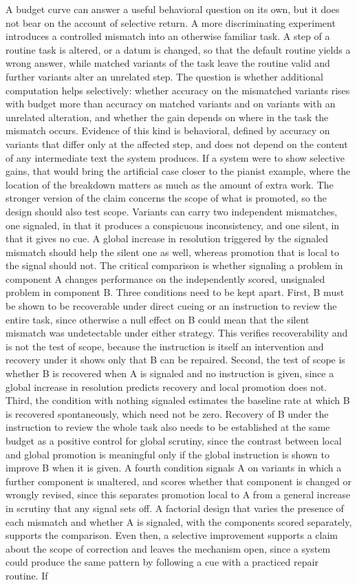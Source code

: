 \documentclass[11pt]{report}
\theoremstyle{remark}
\theoremstyle{definition}
\begin{document}
A budget curve can answer a useful behavioral question on its own, but it does not bear on the account of selective return. A more discriminating experiment introduces a controlled mismatch into an otherwise familiar task. A step of a routine task is altered, or a datum is changed, so that the default routine yields a wrong answer, while matched variants of the task leave the routine valid and further variants alter an unrelated step. The question is whether additional computation helps selectively: whether accuracy on the mismatched variants rises with budget more than accuracy on matched variants and on variants with an unrelated alteration, and whether the gain depends on where in the task the mismatch occurs. Evidence of this kind is behavioral, defined by accuracy on variants that differ only at the affected step, and does not depend on the content of any intermediate text the system produces. If a system were to show selective gains, that would bring the artificial case closer to the pianist example, where the location of the breakdown matters as much as the amount of extra work. The stronger version of the claim concerns the scope of what is promoted, so the design should also test scope. Variants can carry two independent mismatches, one signaled, in that it produces a conspicuous inconsistency, and one silent, in that it gives no cue. A global increase in resolution triggered by the signaled mismatch should help the silent one as well, whereas promotion that is local to the signal should not. The critical comparison is whether signaling a problem in component A changes performance on the independently scored, unsignaled problem in component B. Three conditions need to be kept apart. First, B must be shown to be recoverable under direct cueing or an instruction to review the entire task, since otherwise a null effect on B could mean that the silent mismatch was undetectable under either strategy. This verifies recoverability and is not the test of scope, because the instruction is itself an intervention and recovery under it shows only that B can be repaired. Second, the test of scope is whether B is recovered when A is signaled and no instruction is given, since a global increase in resolution predicts recovery and local promotion does not. Third, the condition with nothing signaled estimates the baseline rate at which B is recovered spontaneously, which need not be zero. Recovery of B under the instruction to review the whole task also needs to be established at the same budget as a positive control for global scrutiny, since the contrast between local and global promotion is meaningful only if the global instruction is shown to improve B when it is given. A fourth condition signals A on variants in which a further component is unaltered, and scores whether that component is changed or wrongly revised, since this separates promotion local to A from a general increase in scrutiny that any signal sets off. A factorial design that varies the presence of each mismatch and whether A is signaled, with the components scored separately, supports the comparison. Even then, a selective improvement supports a claim about the scope of correction and leaves the mechanism open, since a system could produce the same pattern by following a cue with a practiced repair routine. If 
\end{document}
